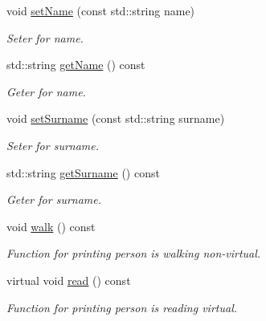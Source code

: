 \begin{DoxyCompactItemize}
void \hyperlink{classPerson_ab66200779d1edff08f2dfd58b971ebf7}{set\+Name} (const std\+::string name)
\begin{DoxyCompactList}\small\item\em Seter for name. \end{DoxyCompactList}\item 
\mbox{\label{classPerson_ab20f096fdfd5201818c45754af4c3e3b}} 
std\+::string \hyperlink{classPerson_ab20f096fdfd5201818c45754af4c3e3b}{get\+Name} () const
\begin{DoxyCompactList}\small\item\em Geter for name. \end{DoxyCompactList}\item 
void \hyperlink{classPerson_a996855e4e2b077b4b14aa217260e099c}{set\+Surname} (const std\+::string surname)
\begin{DoxyCompactList}\small\item\em Seter for surname. \end{DoxyCompactList}\item 
\mbox{\label{classPerson_acc3f116651d5ff9be12268e8eef14b60}} 
std\+::string \hyperlink{classPerson_acc3f116651d5ff9be12268e8eef14b60}{get\+Surname} () const
\begin{DoxyCompactList}\small\item\em Geter for surname. \end{DoxyCompactList}\item 
\mbox{\label{classPerson_aa95be8e441650ef27da3a2b312950bf8}} 
void \hyperlink{classPerson_aa95be8e441650ef27da3a2b312950bf8}{walk} () const
\begin{DoxyCompactList}\small\item\em Function for printing person is walking non-\/virtual. \end{DoxyCompactList}\item 
\mbox{\label{classPerson_a3bcbbeb171865005a49aee106d7b8c77}} 
virtual void \hyperlink{classPerson_a3bcbbeb171865005a49aee106d7b8c77}{read} () const
\begin{DoxyCompactList}\small\item\em Function for printing person is reading virtual. \end{DoxyCompactList}\item 
\mbox{\label{classPerson_a455b3a5331005153a2ca8feb06f97576}} 

\end{DoxyCompactItemize}
